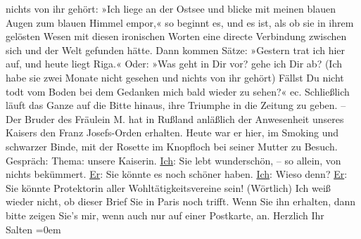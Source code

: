 \begin{ledgroupsized}[t]{13cm}
               nichts von ihr gehört: »Ich liege an der Ostsee
               und blicke mit meinen blauen Augen zum blauen Himmel empor,« so beginnt es, und es
               ist, als ob sie \strikeout{\textcolor{gray}{ih}} in ihrem gelösten Wesen mit diesen ironischen Worten eine directe Verbindung
               zwischen sich und der Welt gefunden hätte. Dann kommen Sätze: »Gestern
               trat ich hier auf, und heute liegt Riga\label{K_L03266-6v}\label{K_L03266-6h}.« Oder: »Was geht in Dir vor? gehe ich {\pb}Dir ab? (Ich habe sie zwei
               Monate nicht gesehen und nichts von ihr gehört) Fällst Du nicht todt vom Boden bei
               dem Gedanken mich bald wieder zu sehen?« ec. Schließlich läuft das Ganze auf die
               Bitte hinaus, ihre Triumphe in die Zeitung zu geben. – Der Bruder des Fräulein M. hat in Rußland
               anläßlich der Anwesenheit unseres Kaisers den Franz Josefs-Orden
               erhalten. Heute war er hier, im Smoking und schwarzer
               Binde, mit der Rosette im Knopfloch bei seiner Mutter zu Besuch. Gespräch: Thema: unsere Kaiserin. \uline{Ich}: Sie lebt wunderschön, – so allein, von nichts bekümmert. \uline{Er}: Sie könnte es noch schöner haben. \uline{Ich}: Wieso denn? \uline{Er}:
               Sie könnte Protektorin aller Wohltätigkeitsvereine sein! (Wörtlich)\pend
           \pstart
           Ich weiß wieder nicht, ob dieser Brief Sie in Paris noch trifft. Wenn Sie ihn erhalten, dann bitte zeigen Sie’s mir, wenn
               auch nur auf einer Postkarte, an.\pend
           \pstart
            Herzlich Ihr {\\[\baselineskip]}\spacefill\mbox{Salten}\pend
           \leftskip=0em{}
         
         \endnumbering{}\end{ledgroupsized}  \newcommand{\dateiname}{L03266}\newcommand{\titel}{Felix Salten an Arthur Schnitzler, 23. 5. 1897}\newcommand{\editorInnen}{Martin Anton Müller und Laura Untner}
      